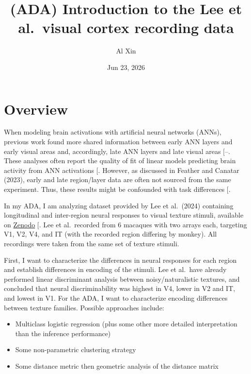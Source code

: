 \documentclass[
  11pt,
  letterpaper,
  DIV=11,
  numbers=noendperiod]{scrartcl}
\title{(ADA) Introduction to the Lee et al.~visual cortex recording
data}
\author{Al Xin}
\date{Jun 23, 2026}
\providecommand{\tightlist}{%
  \setlength{\itemsep}{0pt}\setlength{\parskip}{0pt}}
\begin{document}
\maketitle


\section{Overview}\label{overview}

When modeling brain activations with artificial neural networks (ANNs),
previous work found more shared information between early ANN layers and
early visual areas and, accordingly, late ANN layers and late visual
areas
{[}--\citeproc{ref-nonaka_brain_2021}{3}{]}.
These analyses often report the quality of fit of linear models
predicting brain activity from ANN activations
{[}\citeproc{ref-schrimpf_brain-score_2020}{4}{]}. However, as discussed
in Feather and Canatar (2023), early and late region/layer data are
often not sourced from the same experiment. Thus, these results might be
confounded with task differences
{[}\citeproc{ref-canatar_spectral_2023}{5}{]}.

In my ADA, I am analyzing dataset provided by Lee et al.~(2024)
containing longitudinal and inter-region neural responses to visual
texture stimuli, available on
\href{https://zenodo.org/records/10888270}{Zenodo}
{[}\citeproc{ref-lee_developmentally_2024}{6}{]}. Lee et al.~recorded
from 6 macaques with two arrays each, targeting V1, V2, V4, and IT (with
the recorded region differing by monkey). All recordings were taken from
the same set of texture stimuli.

First, I want to characterize the differences in neural responses for
each region and establish differences in encoding of the stimuli. Lee et
al.~have already performed linear discriminant analysis between
noisy/naturalistic textures, and concluded that neural discriminability
was highest in V4, lower in V2 and IT, and lowest in V1. For the ADA, I
want to characterize encoding differences between texture families.
Possible approaches include:

\begin{itemize}
\tightlist
\item
  Multiclass logistic regression (plus some other more detailed
  interpretation than the inference performance)
\item
  Some non-parametric clustering strategy
\item
  Some distance metric then geometric analysis of the distance matrix
\end{itemize}
\end{document}
